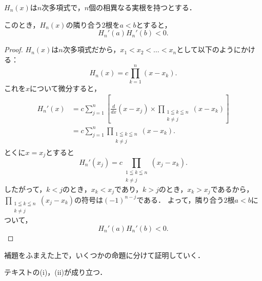 

\begin{lemma}{}{}
  $H_n(x)$は$n$次多項式で，$n$個の相異なる実根を持つとする．

  このとき，$H_n (x)$の隣り合う$2$根を$a < b$とすると，
  \[
    H_n'(a) H_n'(b)<0.
  \]
\end{lemma}

\begin{proof}
  $H_n (x)$は$n$次多項式だから，$x_1 < x_2 < \dots <x_n$として以下のようにかける：
  \[
    H_n (x) = c \prod_{k=1}^{n} (x-x_k).
  \]
  これを$x$について微分すると，
  \begin{align*}
    H_n '(x) & = c \sum_{j=1}^{n} \left[ \frac{d}{dx} (x-x_j) \times  \prod_{\substack{1 \leqq k \leqq n \\ k \ne j}} (x-x_k) \right] \\
             & = c \sum_{j=1}^{n} \prod_{\substack{1 \leqq k \leqq n                                     \\ k \ne j}} (x-x_k).
  \end{align*}
  とくに$x = x_j$とすると
  \[
    H_n '(x_j) = c \prod_{\substack{1 \leqq k \leqq n \\ k \ne j}} (x_j-x_k).
  \]
  したがって，$k <j$のとき，$x_k < x_j$であり，$k > j$のとき，$x_k > x_j$であるから，
  $\prod_{\substack{1 \leqq k \leqq n \\ k \ne j}} (x_j-x_k)$の符号は$(-1)^{n-j}$である．
  よって，隣り合う$2$根$a < b$について，
  \[
    H_n '(a) H_n ' (b)<0.
  \]
\end{proof}

補題をふまえた上で，いくつかの命題に分けて証明していく．

\begin{proposition}{}{}
  テキストの(i)，(ii)が成り立つ．
\end{proposition}


